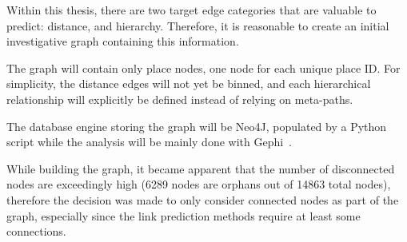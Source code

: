 Within this thesis, there are two target edge categories that are valuable to predict: distance, and hierarchy.
Therefore, it is reasonable to create an initial investigative graph containing this information.

The graph will contain only place nodes, one node for each unique place ID. For simplicity, the distance edges
will not yet be binned, and each hierarchical relationship will explicitly be defined instead of relying on meta-paths.

The database engine storing the graph will be Neo4J, populated by a Python script while the analysis will be mainly done
with Gephi~\cite{Gephi}.

While building the graph, it became apparent that the number of disconnected nodes are exceedingly high (6289 nodes are orphans out of 14863 total nodes), therefore
the decision was made to only consider connected nodes as part of the graph, especially since the link prediction methods
require at least some connections.